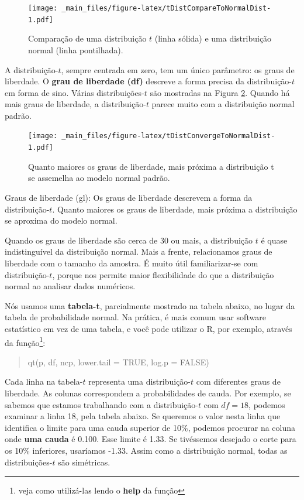 \documentclass[
]{book}
\theoremstyle{definition}
\theoremstyle{definition}
\theoremstyle{definition}
\theoremstyle{definition}
\theoremstyle{remark}
\begin{document}
\begin{figure}
\centering
\texttt{[image: \_main\_files/figure-latex/tDistCompareToNormalDist-1.pdf]}
\caption{\label{fig:tDistCompareToNormalDist}Comparação de uma distribuição \(t\) (linha sólida) e uma distribuição normal (linha pontilhada).}
\end{figure}

A distribuição-\(t\), sempre centrada em zero, tem um único parâmetro: os graus de liberdade. O \textbf{grau de liberdade (df)} descreve a forma precisa da distribuição-\(t\) em forma de sino. Várias distribuições-\(t\) são mostradas na Figura \ref{fig:tDistConvergeToNormalDist}. Quando há mais graus de liberdade, a distribuição-\(t\) parece muito com a distribuição normal padrão.

\begin{figure}
\centering
\texttt{[image: \_main\_files/figure-latex/tDistConvergeToNormalDist-1.pdf]}
\caption{\label{fig:tDistConvergeToNormalDist}Quanto maiores os graus de liberdade, mais próxima a distribuição t se assemelha ao modelo normal padrão.}
\end{figure}

Graus de liberdade (gl): Os graus de liberdade descrevem a forma da distribuição-\(t\). Quanto maiores os graus de liberdade, mais próxima a distribuição se aproxima do modelo normal.

Quando os graus de liberdade são cerca de 30 ou mais, a distribuição \(t\) é quase indistinguível da distribuição normal. Mais a frente, relacionamos graus de liberdade com o tamanho da amostra. É muito útil familiarizar-se com distribuição-\(t\), porque nos permite maior flexibilidade do que a distribuição normal ao analisar dados numéricos.

Nós usamos uma \textbf{tabela-t}, parcialmente mostrado na tabela abaixo, no lugar da tabela de probabilidade normal. Na prática, é mais comum usar software estatístico em vez de uma tabela, e você pode utilizar o R, por exemplo, através da função\footnote{veja como utilizá-las lendo o \textbf{help} da função}:

\begin{quote}
qt(p, df, ncp, lower.tail = TRUE, log.p = FALSE)
\end{quote}

Cada linha na tabela-\(t\) representa uma distribuição-\(t\) com diferentes graus de liberdade. As colunas correspondem a probabilidades de cauda. Por exemplo, se sabemos que estamos trabalhando com a distribuição-\(t\) com \(df = 18\), podemos examinar a linha 18, pela tabela abaixo. Se queremos o valor nesta linha que identifica o limite para uma cauda superior de 10\%, podemos procurar na coluna onde \textbf{uma cauda} é 0.100. Esse limite é 1.33. Se tivéssemos desejado o corte para os 10\% inferiores, usaríamos -1.33. Assim como a distribuição normal, todas as distribuições-\(t\) são simétricas.
\end{document}
